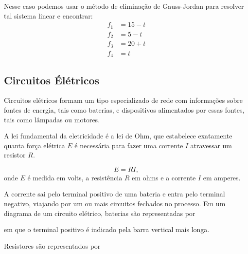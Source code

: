 Nesse caso podemos usar o método de eliminação de Gauss-Jordan para resolver tal sistema linear e encontrar:
\begin{align*}
    f_1 &= 15 - t\\
    f_2 &= 5 - t\\
    f_3 &= 20 + t\\
    f_4 &= t
\end{align*}

\subsection{Circuitos Élétricos}

Circuitos elétricos formam um tipo especializado de rede com informações sobre fontes de energia, tais como baterias, e dispositivos alimentados por essas fontes, tais como lâmpadas ou motores.

A lei fundamental da eletricidade é a \textrm{lei de Ohm}, que estabelece exatamente quanta força elétrica $E$ é necessária para fazer uma corrente $I$ atravessar um resistor $R$.

\begin{definicao}
    \[
        E = RI,
    \] 
    onde $E$ é medida em \textrm{volts}, a resistência $R$ em \textrm{ohms} e a corrente $I$ em \textrm{amperes}.
\end{definicao}

A corrente sai pelo terminal positivo de uma bateria e entra pelo terminal negativo, viajando por um ou mais circuitos fechados no processo. Em um diagrama de um circuito elétrico, baterias são representadas por
\begin{center}
\end{center}
em que o terminal positivo é indicado pela barra vertical mais longa.

Resistores são representados por
\begin{center}
\end{center}

